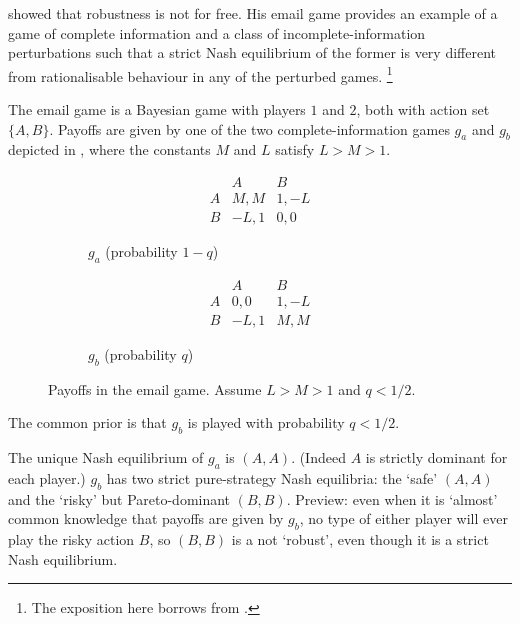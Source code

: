 \documentclass[11pt,letterpaper,reqno,oneside]{article}
\begin{document}
\textcite{Rubinstein1989} showed that robustness is not for free. His email game provides an example of a game of complete information and a class of incomplete-information perturbations such that a strict Nash equilibrium of the former is very different from rationalisable behaviour in any of the perturbed games.%
	\footnote{The exposition here borrows from \textcite[][sec. 5.5]{OsborneRubinstein1994}.}

The email game is a Bayesian game with players $1$ and $2$, both with action set $\{A,B\}$. Payoffs are given by one of the two complete-information games $g_a$ and $g_b$ depicted in , where the constants $M$ and $L$ satisfy $L>M>1$.
%
\begin{figure}
	\begin{subfigure}{0.5\textwidth}
		\begin{equation*}
			\begin{array}{c|cc}
					& A		& B		\\ \hline
				A	& M,M	& 1,-L	\\
				B	& -L,1	& 0,0	
			\end{array}
		\end{equation*}
		\caption{$g_a$ (probability $1-q$)}
	\end{subfigure}
	\begin{subfigure}{0.5\textwidth}
		\begin{equation*}
			\begin{array}{c|cc}
					& A		& B		\\ \hline
				A	& 0,0	& 1,-L	\\
				B	& -L,1	& M,M	
			\end{array}
		\end{equation*}
		\caption{$g_b$ (probability $q$)}
	\end{subfigure}
	\caption{Payoffs in the email game. Assume $L>M>1$ and $q<1/2$.}
	\label{fig:email_game_payoffs}
\end{figure}
%
The common prior is that $g_b$ is played with probability $q<1/2$.

The unique Nash equilibrium of $g_a$ is $(A,A)$. (Indeed $A$ is strictly dominant for each player.) $g_b$ has two strict pure-strategy Nash equilibria: the `safe' $(A,A)$ and the `risky' but Pareto-dominant $(B,B)$. Preview: even when it is `almost' common knowledge that payoffs are given by $g_b$, no type of either player will ever play the risky action $B$, so $(B,B)$ is a not `robust', even though it is a strict Nash equilibrium.
\end{document}
